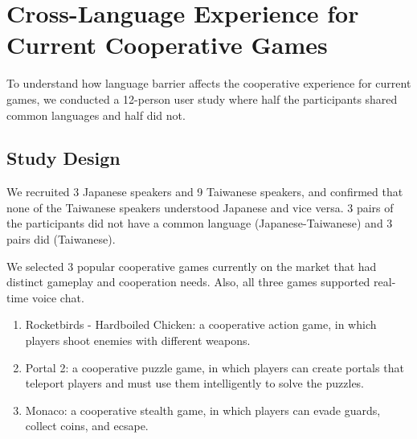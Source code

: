 \section{Cross-Language Experience for Current Cooperative Games}


To understand how language barrier affects the cooperative experience for current games, we conducted a 12-person user study where half the participants shared common languages and half did not. 

\subsection{Study Design}

We recruited 3 Japanese speakers and 9 Taiwanese speakers, and confirmed that none of the Taiwanese speakers understood Japanese and vice versa. 3 pairs of the participants did not have a common language (Japanese-Taiwanese) and 3 pairs did (Taiwanese).

We selected 3 popular cooperative games currently on the market that had distinct gameplay and cooperation needs. Also, all three games supported real-time voice chat. 
\begin{enumerate}
    \item Rocketbirds - Hardboiled Chicken: a cooperative action game, in which players shoot enemies with different weapons.
    
    \item Portal 2: a cooperative puzzle game, in which players can create portals that teleport players and must use them intelligently to solve the puzzles.
    
    \item Monaco: a cooperative stealth game, in which players can evade guards, collect coins, and ecsape.
\end{enumerate}


